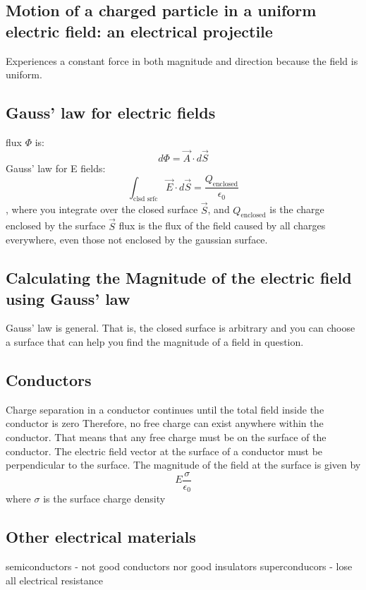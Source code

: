 \documentclass[twocolumn]{article}
\begin{document}
\subsection{Motion of a charged particle in a uniform electric field: an electrical projectile}
\begin{outline}
	\1 Experiences a constant force in both magnitude and direction because the field is uniform.
\end{outline}
\subsection{Gauss' law for electric fields}
\begin{outline}
	\1 flux $\Phi$ is: \[d\Phi=\vec{A}\cdot d\vec{S}\]
	\1 Gauss' law for E fields: \[\int_{\text{clsd srfc}}\vec{E}\cdot d\vec{S}=\dfrac{Q_{\text{enclosed}}}{\epsilon_0}\], where you integrate over the closed surface $\vec{S}$, and $Q_{\text{enclosed}}$ is the charge enclosed by the surface $\vec{S}$
	\1 flux is the flux of the field caused by all charges everywhere, even those not enclosed by the gaussian surface. 
\end{outline}
\subsection{Calculating the Magnitude of the electric field using Gauss' law}
\begin{outline}
	\1 Gauss' law is general. That is, the closed surface is arbitrary and you can choose a surface that can help you find the magnitude of a field in question. 
\end{outline}
\subsection{Conductors}
\begin{outline}
	\1 Charge separation in a conductor continues until the total field inside the conductor is zero
	\1 Therefore, no free charge can exist anywhere within the conductor.
	\1 That means that any free charge must be on the surface of the conductor. 
	\1 The electric field vector at the surface of a conductor must be perpendicular to the surface. 
	\1 The magnitude of the field at the surface is given by \[E\dfrac{\sigma}{\epsilon_0}\] where $\sigma$ is the surface charge density
\end{outline}
\subsection{Other electrical materials}
\begin{outline}
	\1 semiconductors - not good conductors nor good insulators 
	\1 superconducors - lose all electrical resistance
\end{outline}
\end{document}
